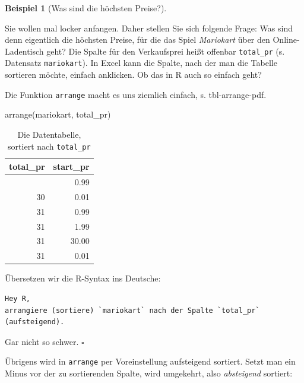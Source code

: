 \documentclass[
  letterpaper,
  twoside,
  open=any]{scrbook}
\newenvironment{Shaded}{\begin{snugshade}}{\end{snugshade}}
\newcommand{\FunctionTok}[1]{\textcolor[rgb]{0.28,0.35,0.67}{#1}}
\newcommand{\NormalTok}[1]{\textcolor[rgb]{0.00,0.23,0.31}{#1}}
\theoremstyle{definition}
\theoremstyle{definition}
\theoremstyle{definition}
\newtheorem{example}{Beispiel}[chapter]
\theoremstyle{remark}
\begin{document}
\begin{example}[Was sind die höchsten
Preise?]\protect\hypertarget{exm-arrange1}{}\label{exm-arrange1}

Sie wollen mal locker anfangen. Daher stellen Sie sich folgende Frage:
Was sind denn eigentlich die höchsten Preise, für die das Spiel
\emph{Mariokart} über den Online-Ladentisch geht? Die Spalte für den
Verkaufsprei heißt offenbar \texttt{total\_pr} (s. Datensatz
\texttt{mariokart}). In Excel kann die Spalte, nach der man die Tabelle
sortieren möchte, einfach anklicken. Ob das in R auch so einfach geht?

Die Funktion \texttt{arrange} macht es uns ziemlich einfach, s.
tbl-arrange-pdf.

\begin{Shaded}
\begin{Highlighting}[]
\FunctionTok{arrange}\NormalTok{(mariokart, total\_pr) }
\end{Highlighting}
\end{Shaded}

\begin{longtable}[]{@{}rr@{}}

\caption{\label{tbl-arrange-pdf}Die Datentabelle, sortiert nach
\texttt{total\_pr}}

\tabularnewline

\toprule\noalign{}
total\_pr & start\_pr \\
\midrule\noalign{}
\endhead
\bottomrule\noalign{}
\endlastfoot
29 & 0.99 \\
30 & 0.01 \\
31 & 0.99 \\
31 & 1.99 \\
31 & 30.00 \\
31 & 0.01 \\

\end{longtable}

Übersetzen wir die R-Syntax ins Deutsche:

\begin{verbatim}
Hey R,
arrangiere (sortiere) `mariokart` nach der Spalte `total_pr` (aufsteigend).
\end{verbatim}

Gar nicht so schwer. \(\square\)

\end{example}

Übrigens wird in \texttt{arrange} per Voreinstellung aufsteigend
sortiert. Setzt man ein Minus vor der zu sortierenden Spalte, wird
umgekehrt, also \emph{absteigend} sortiert:
\end{document}
